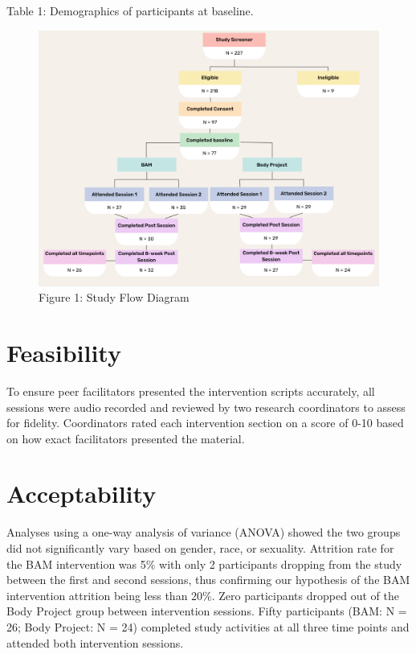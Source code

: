 \documentclass[
  letterpaper,
  DIV=11,
  numbers=noendperiod]{scrreprt}
\begin{document}
Table 1: Demographics of participants at baseline.

\begin{figure}

{\centering \includegraphics{./BAM_Study_Flow.png}

}

\caption{Figure 1: Study Flow Diagram}

\end{figure}


\hypertarget{feasibility}{%
\chapter{Feasibility}\label{feasibility}}

To ensure peer facilitators presented the intervention scripts
accurately, all sessions were audio recorded and reviewed by two
research coordinators to assess for fidelity. Coordinators rated each
intervention section on a score of 0-10 based on how exact facilitators
presented the material.


\hypertarget{acceptability}{%
\chapter{Acceptability}\label{acceptability}}

Analyses using a one-way analysis of variance (ANOVA) showed the two
groups did not significantly vary based on gender, race, or sexuality.
Attrition rate for the BAM intervention was 5\% with only 2 participants
dropping from the study between the first and second sessions, thus
confirming our hypothesis of the BAM intervention attrition being less
than 20\%. Zero participants dropped out of the Body Project group
between intervention sessions. Fifty participants (BAM: N = 26; Body
Project: N = 24) completed study activities at all three time points and
attended both intervention sessions.
\end{document}

